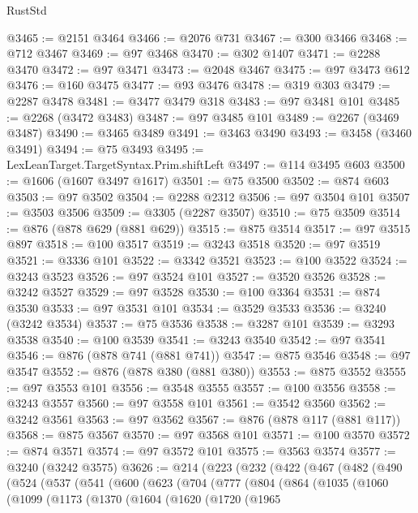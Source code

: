 \begin{lexlean}{RustStd}
\begin{coremodule}
@3465 := @2151 @3464
@3466 := @2076 @731
@3467 := @300 @3466
@3468 := @712 @3467
@3469 := @97 @3468
@3470 := @302 @1407
@3471 := @2288 @3470
@3472 := @97 @3471
@3473 := @2048 @3467
@3475 := @97 @3473 @612
@3476 := @160 @3475
@3477 := @93 @3476
@3478 := @319 @303
@3479 := @2287 @3478
@3481 := @3477 @3479 @318
@3483 := @97 @3481 @101
@3485 := @2268 (@3472 @3483)
@3487 := @97 @3485 @101
@3489 := @2267 (@3469 @3487)
@3490 := @3465 @3489
@3491 := @3463 @3490
@3493 := @3458 (@3460 @3491)
@3494 := @75 @3493
@3495 := LexLeanTarget.TargetSyntax.Prim.shiftLeft
@3497 := @114 @3495 @603
@3500 := @1606 (@1607 @3497 @1617)
@3501 := @75 @3500
@3502 := @874 @603
@3503 := @97 @3502
@3504 := @2288 @2312
@3506 := @97 @3504 @101
@3507 := @3503 @3506
@3509 := @3305 (@2287 @3507)
@3510 := @75 @3509
@3514 := @876 (@878 @629 (@881 @629))
@3515 := @875 @3514
@3517 := @97 @3515 @897
@3518 := @100 @3517
@3519 := @3243 @3518
@3520 := @97 @3519
@3521 := @3336 @101
@3522 := @3342 @3521
@3523 := @100 @3522
@3524 := @3243 @3523
@3526 := @97 @3524 @101
@3527 := @3520 @3526
@3528 := @3242 @3527
@3529 := @97 @3528
@3530 := @100 @3364
@3531 := @874 @3530
@3533 := @97 @3531 @101
@3534 := @3529 @3533
@3536 := @3240 (@3242 @3534)
@3537 := @75 @3536
@3538 := @3287 @101
@3539 := @3293 @3538
@3540 := @100 @3539
@3541 := @3243 @3540
@3542 := @97 @3541
@3546 := @876 (@878 @741 (@881 @741))
@3547 := @875 @3546
@3548 := @97 @3547
@3552 := @876 (@878 @380 (@881 @380))
@3553 := @875 @3552
@3555 := @97 @3553 @101
@3556 := @3548 @3555
@3557 := @100 @3556
@3558 := @3243 @3557
@3560 := @97 @3558 @101
@3561 := @3542 @3560
@3562 := @3242 @3561
@3563 := @97 @3562
@3567 := @876 (@878 @117 (@881 @117))
@3568 := @875 @3567
@3570 := @97 @3568 @101
@3571 := @100 @3570
@3572 := @874 @3571
@3574 := @97 @3572 @101
@3575 := @3563 @3574
@3577 := @3240 (@3242 @3575)
@3626 := @214
    (@223
      (@232
        (@422
          (@467
            (@482
              (@490
                (@524
                  (@537
                    (@541
                      (@600
                        (@623
                          (@704
                            (@777
                              (@804
                                (@864
                                  (@1035
                                    (@1060
                                      (@1099
                                        (@1173
                                          (@1370
                                            (@1604
                                              (@1620
                                                (@1720
                                                  (@1965

\end{coremodule}
\end{lexlean}
